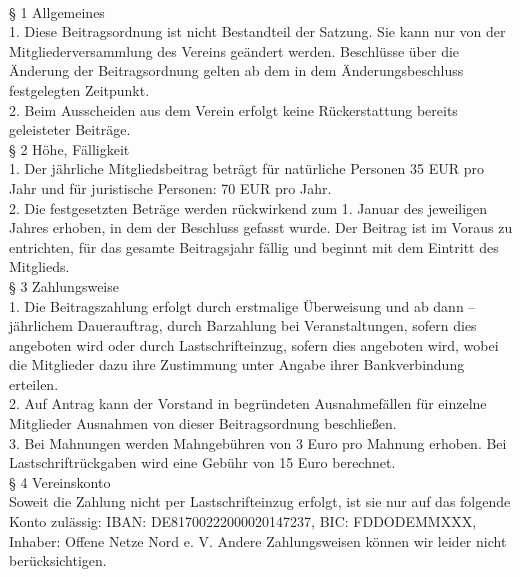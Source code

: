 \documentclass[a4paper,8pt]{article}
\begin{document}
\ \\

§ 1 Allgemeines
\\

1. Diese Beitragsordnung ist nicht Bestandteil der Satzung. Sie kann nur von der Mitgliederversammlung des Vereins geändert werden. Beschlüsse über die Änderung der Beitragsordnung gelten ab dem in dem Änderungsbeschluss festgelegten Zeitpunkt.
\\

2. Beim Ausscheiden aus dem Verein erfolgt keine Rückerstattung bereits geleisteter Beiträge.
\\

§ 2 Höhe, Fälligkeit
\\

1. Der jährliche Mitgliedsbeitrag beträgt für natürliche Personen 35 EUR pro Jahr und für juristische Personen: 70 EUR pro Jahr. 
\\

2. Die festgesetzten Beträge werden rückwirkend zum 1. Januar des jeweiligen Jahres erhoben, in dem der Beschluss gefasst wurde. Der Beitrag ist im Voraus zu entrichten, für das gesamte Beitragsjahr fällig und beginnt mit dem Eintritt des Mitglieds.
\\

§ 3 Zahlungsweise
\\

1. Die Beitragszahlung erfolgt durch erstmalige Überweisung und ab dann – jährlichem Dauerauftrag, durch Barzahlung bei Veranstaltungen, sofern dies angeboten wird oder durch Lastschrifteinzug, sofern dies angeboten wird, wobei die Mitglieder dazu ihre Zustimmung unter Angabe ihrer Bankverbindung erteilen. 
\\

2. Auf  Antrag kann der Vorstand in begründeten Ausnahmefällen für einzelne Mitglieder Ausnahmen von dieser Beitragsordnung beschließen.
\\

3. Bei Mahnungen werden Mahngebühren von 3 Euro pro Mahnung erhoben. Bei Lastschriftrückgaben wird eine Gebühr von 15 Euro berechnet.
\\

§ 4 Vereinskonto
\\

Soweit die Zahlung nicht per Lastschrifteinzug erfolgt, ist sie nur auf das folgende Konto zulässig: IBAN: DE81700222000020147237, BIC: FDDODEMMXXX, Inhaber: Offene Netze Nord e. V. Andere Zahlungsweisen können wir leider nicht berücksichtigen.
\\
\end{document}
